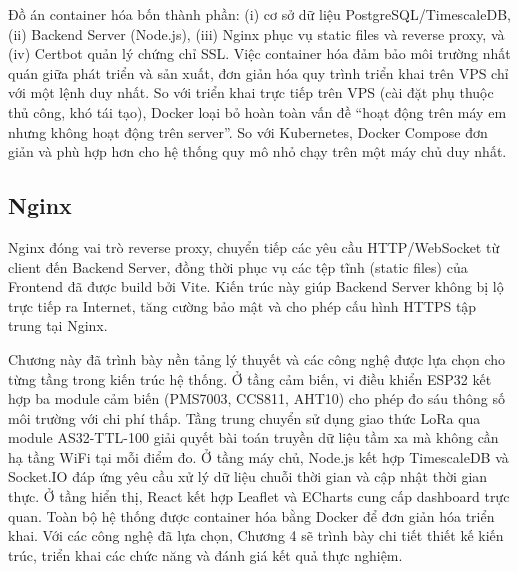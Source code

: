 \documentclass[../DoAn.tex]{subfiles}
\begin{document}
Đồ án container hóa bốn thành phần: (i) cơ sở dữ liệu PostgreSQL/TimescaleDB, (ii) Backend Server (Node.js), (iii) Nginx phục vụ static files và reverse proxy, và (iv) Certbot quản lý chứng chỉ SSL. Việc container hóa đảm bảo môi trường nhất quán giữa phát triển và sản xuất, đơn giản hóa quy trình triển khai trên VPS chỉ với một lệnh duy nhất. So với triển khai trực tiếp trên VPS (cài đặt phụ thuộc thủ công, khó tái tạo), Docker loại bỏ hoàn toàn vấn đề ``hoạt động trên máy em nhưng không hoạt động trên server''. So với Kubernetes, Docker Compose đơn giản và phù hợp hơn cho hệ thống quy mô nhỏ chạy trên một máy chủ duy nhất.

\subsection{Nginx}
\label{subsection:3.7.2}

Nginx đóng vai trò reverse proxy, chuyển tiếp các yêu cầu \gls{HTTP}/WebSocket từ client đến Backend Server, đồng thời phục vụ các tệp tĩnh (static files) của Frontend đã được build bởi Vite. Kiến trúc này giúp Backend Server không bị lộ trực tiếp ra Internet, tăng cường bảo mật và cho phép cấu hình HTTPS tập trung tại Nginx.

Chương này đã trình bày nền tảng lý thuyết và các công nghệ được lựa chọn cho từng tầng trong kiến trúc hệ thống. Ở tầng cảm biến, vi điều khiển ESP32 kết hợp ba module cảm biến (PMS7003, CCS811, AHT10) cho phép đo sáu thông số môi trường với chi phí thấp. Tầng trung chuyển sử dụng giao thức \gls{LoRa} qua module AS32-TTL-100 giải quyết bài toán truyền dữ liệu tầm xa mà không cần hạ tầng WiFi tại mỗi điểm đo. Ở tầng máy chủ, Node.js kết hợp TimescaleDB và Socket.IO đáp ứng yêu cầu xử lý dữ liệu chuỗi thời gian và cập nhật thời gian thực. Ở tầng hiển thị, React kết hợp Leaflet và ECharts cung cấp dashboard trực quan. Toàn bộ hệ thống được container hóa bằng Docker để đơn giản hóa triển khai. Với các công nghệ đã lựa chọn, Chương 4 sẽ trình bày chi tiết thiết kế kiến trúc, triển khai các chức năng và đánh giá kết quả thực nghiệm.

\end{document}
